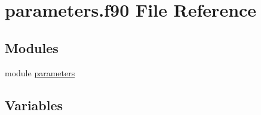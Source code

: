 \hypertarget{parameters_8f90}{
\section{parameters.f90 File Reference}
\label{parameters_8f90}
}
\subsection*{Modules}
\begin{DoxyCompactItemize}
\item 
module \hyperlink{namespaceparameters}{parameters}
\end{DoxyCompactItemize}
\subsection*{Variables}
